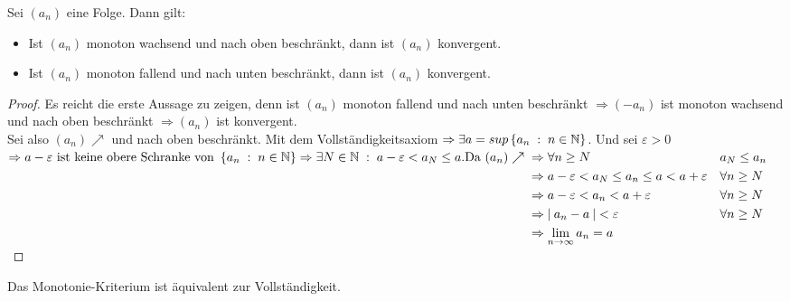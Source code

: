 \documentclass[a4paper,titlepage,oneside]{article}
\def\N{\ensuremath{\mathbb{N}} }
\renewcommand{\epsilon}{\ensuremath{\varepsilon} }
\def\sp{\hspace{0,1cm}}
\def\spcolon{\sp:\sp}
\renewcommand{\liminf}[2][n]{\ensuremath{\lim\limits_{#1 \rightarrow \infty}{#2}}}
\newcommand{\abs}[1]{\ensuremath{\left|\:#1\:\right|}}
\newcommand{\menge}[2]{\ensuremath{\left\{#1\sp : \sp #2\right\}}}
\theoremstyle{thmstyle}
\begin{document}
\begin{subsatz}[Monotoniekriterium]
Sei $(a_n)$ eine Folge. Dann gilt:
\begin{itemize}
\item Ist $(a_n)$ monoton wachsend und nach oben beschränkt, dann ist $(a_n)$ konvergent.
\item Ist $(a_n)$ monoton fallend  und nach unten beschränkt, dann ist $(a_n)$ konvergent.
\end{itemize}
\begin{proof}
Es reicht die erste Aussage zu zeigen, denn ist $(a_n)$ monoton fallend und nach unten beschränkt \( \Rightarrow (-a_n)\) ist monoton wachsend und nach oben beschränkt $\Rightarrow (a_n) $ ist konvergent.\\
Sei also \((a_n) \nearrow \) und nach oben beschränkt. Mit dem Vollständigkeitsaxiom \(\Rightarrow \exists a = sup\menge{a_n}{n \in \N}\). Und sei $\epsilon > 0$
\begin{math}
\Rightarrow a - \epsilon \text{ ist keine obere Schranke von } \menge{a_n}{n \in \N} \Rightarrow \exists N \in \N \spcolon a-\epsilon < a_N \le a.\\
\text{Da }(a_n) \nearrow \begin{aligned}[t]
					&\Rightarrow \forall n \ge N 						&& a_N \le a_n \\
					&\Rightarrow a-\epsilon < a_N \le a_n \le a < a+\epsilon 	&& \forall n \ge N \\
					&\Rightarrow a-\epsilon < a_n < a+\epsilon 			&& \forall n \ge N \\
					&\Rightarrow \abs{a_n - a} < \epsilon					&& \forall n \ge N \\
					&\Rightarrow \liminf{a_n} = a \end{aligned}\end{math}
\end{proof}
\end{subsatz}

\begin{subbem}
Das Monotonie-Kriterium ist äquivalent zur Vollständigkeit.
\end{subbem}
\end{document}
